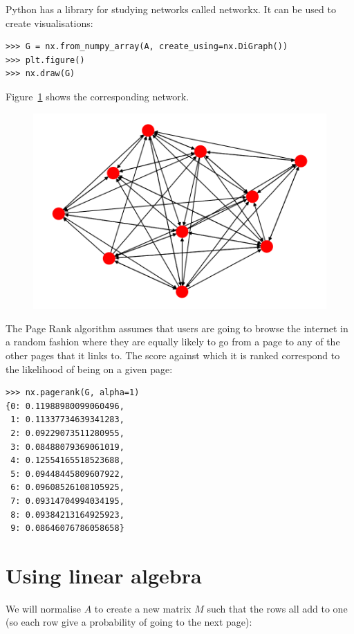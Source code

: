 \documentclass[a4paper]{article}
\begin{document}
Python has a library for studying networks called networkx. It can be used to
create visualisations:

\begin{verbatim}
>>> G = nx.from_numpy_array(A, create_using=nx.DiGraph())
>>> plt.figure()
>>> nx.draw(G)
\end{verbatim}

Figure~\ref{fig:image_of_graph} shows the corresponding network.

\begin{figure}[!hbtp]
    \includegraphics[width=.8\textwidth]{graph.pdf}
    \label{fig:image_of_graph}
\end{figure}

The Page Rank algorithm assumes that users are going to browse the internet in a
random fashion where they are equally likely to go from a page to any of the
other pages that it links to. The score against which it is ranked correspond to
the likelihood of being on a given page:

\begin{verbatim}
>>> nx.pagerank(G, alpha=1)
{0: 0.11988980099060496,
 1: 0.11337734639341283,
 2: 0.09229073511280955,
 3: 0.08488079369061019,
 4: 0.12554165518523688,
 5: 0.09448445809607922,
 6: 0.09608526108105925,
 7: 0.09314704994034195,
 8: 0.09384213164925923,
 9: 0.08646076786058658}
\end{verbatim}

\section{Using linear algebra}

We will normalise \(A\) to create a new matrix \(M\) such that the rows all add
to one (so each row give a probability of going to the next page):
\end{document}
